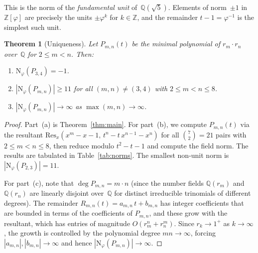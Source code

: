 \documentclass[12pt]{article}
\newtheorem{theorem}{Theorem}
\newcommand{\Z}{\mathbb{Z}}
\newcommand{\Q}{\mathbb{Q}}
\newcommand{\N}{\mathrm{N}}
\begin{document}
This is the norm of the \emph{fundamental unit}
of~$\Q(\sqrt{5})$. Elements of norm~$\pm 1$ in $\Z[\varphi]$
are precisely the units $\pm\varphi^k$ for $k \in \Z$, and the
remainder $t - 1 = \varphi^{-1}$ is the simplest such unit.

\begin{theorem}[Uniqueness]\label{thm:unique}
Let $P_{m,n}(t)$ be the minimal polynomial of $r_m \cdot r_n$
over~$\Q$ for $2 \leq m < n$. Then:
\begin{enumerate}
\item[\textup{(a)}] $\N_\varphi(P_{3,4}) = -1$.
\item[\textup{(b)}] $|\N_\varphi(P_{m,n})| \geq 11$ for all
  $(m,n) \neq (3,4)$ with $2 \leq m < n \leq 8$.
\item[\textup{(c)}] $|\N_\varphi(P_{m,n})| \to \infty$ as
  $\max(m,n) \to \infty$.
\end{enumerate}
\end{theorem}

\begin{proof}
Part~(a) is Theorem~\ref{thm:main}. For part~(b), we compute
$P_{m,n}(t)$ via the resultant
$\mathrm{Res}_x(x^m - x - 1,\, t^n - t\,x^{n-1} - x^n)$
for all $\binom{7}{2} = 21$ pairs with $2 \leq m < n \leq 8$,
then reduce modulo $t^2 - t - 1$ and compute the field norm.
The results are tabulated in Table~\ref{tab:norms}. The smallest
non-unit norm is $|\N_\varphi(P_{2,3})| = 11$.

For part~(c), note that $\deg P_{m,n} = m \cdot n$ (since the
number fields $\Q(r_m)$ and $\Q(r_n)$ are linearly disjoint
over~$\Q$ for distinct irreducible trinomials of different degrees).
The remainder $R_{m,n}(t) = a_{m,n}\,t + b_{m,n}$ has integer
coefficients that are bounded in terms of the coefficients of
$P_{m,n}$, and these grow with the resultant, which has
entries of magnitude $O(r_m^n + r_n^m)$. Since $r_k \to 1^+$
as $k \to \infty$, the growth is controlled by the polynomial
degree $mn \to \infty$, forcing $|a_{m,n}|, |b_{m,n}| \to \infty$
and hence $|\N_\varphi(P_{m,n})| \to \infty$.
\end{proof}
\end{document}
